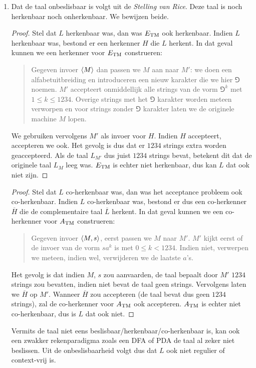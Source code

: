 \documentclass[a4paper]{article}
\begin{document}
\begin{question}
\begin{answer}
\begin{enumerate}
 \item Dat de taal onbeslisbaar is volgt uit de \emph{Stelling van Rice}. Deze taal is noch herkenbaar noch onherkenbaar. We bewijzen beide.
 \begin{proof}
  Stel dat $L$ herkenbaar was, dan was $E_{\rm TM}$ ook herkenbaar. Indien $L$ herkenbaar was, bestond er een herkenner $H$ die $L$ herkent. In dat geval kunnen we een herkenner voor $E_{\rm TM}$ construeren:
  \begin{quote}
   Gegeven invoer $\left\langle M \right\rangle$ dan passen we $M$ aan naar $M'$: we doen een alfabetuitbreiding en introduceren een nieuw karakter die we hier $\Game$ noemen. $M'$ accepteert onmiddellijk alle strings van de vorm $\Game^k$ met $1\leq k\leq1234$. Overige strings met het $\Game$ karakter worden meteen verworpen en voor strings zonder $\Game$ karakter laten we de originele machine $M$ lopen.
  \end{quote}
  We gebruiken vervolgens $M'$ als invoer voor $H$. Indien $H$ accepteert, accepteren we ook. Het gevolg is dus dat er $1234$ strings extra worden geaccepteerd. Als de taal $L_{M'}$ dus juist $1234$ strings bevat, betekent dit dat de originele taal $L_M$ leeg was. $E_{\rm TM}$ is echter niet herkenbaar, dus kan $L$ dat ook niet zijn.
 \end{proof}
 \begin{proof}
  Stel dat $L$ co-herkenbaar was, dan was het acceptance probleem ook co-herkenbaar. Indien $L$ co-herkenbaar was, bestond er dus een co-herkenner $\overline{H}$ die de complementaire taal $\overline{L}$ herkent. In dat geval kunnen we een co-herkenner voor $A_{\rm TM}$ construeren:
  \begin{quote}
   Gegeven invoer $\left\langle M,s \right\rangle$, eerst passen we $M$ naar $M'$. $M'$ kijkt eerst of de invoer van de vorm $sa^{k}$ is met $0\leq k<1234$. Indien niet, verwerpen we meteen, indien wel, verwijderen we de laatste $a$'s. 
  \end{quote}
  Het gevolg is dat indien $M$, $s$ zou aanvaarden, de taal bepaalt door $M'$ $1234$ strings zou bevatten, indien niet bevat de taal geen strings. Vervolgens laten we $\overline{H}$ op $M'$. Wanneer $\overline{H}$ zou accepteren (de taal bevat dus geen $1234$ strings), zal de co-herkenner voor $A_{\rm TM}$ ook accepteren. $A_{\rm TM}$ is echter niet co-herkenbaar, dus is $L$ dat ook niet.
 \end{proof}
 Vermits de taal niet eens beslisbaar/herkenbaar/co-herkenbaar is, kan ook een zwakker rekenparadigma zoals een DFA of PDA de taal al zeker niet beslissen. Uit de onbeslisbaarheid volgt dus dat $L$ ook niet regulier of context-vrij is.

\end{enumerate}
\end{answer}
\end{question}
\end{document}
